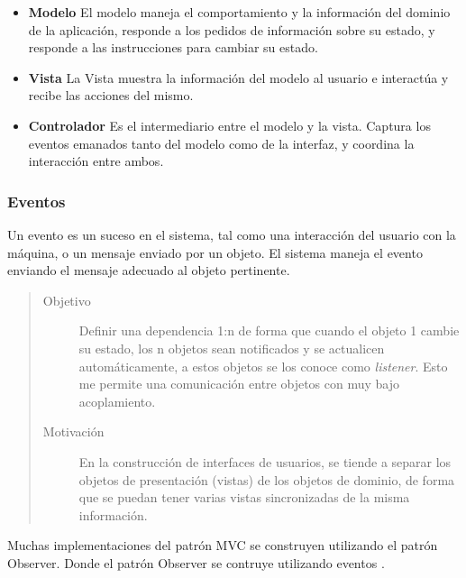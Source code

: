 	\begin {itemize}
	
		\item {\bf Modelo}
			El modelo maneja el comportamiento y la información del dominio de la
			aplicación, responde a los pedidos de información sobre su estado, 
			y responde a las instrucciones para cambiar su estado. 
			
			
		\item {\bf Vista}
			La Vista muestra la información del modelo al usuario e interactúa y recibe
			las acciones del mismo.
			
		\item {\bf Controlador}
			Es el intermediario entre el modelo y la vista.
			Captura los eventos emanados tanto del modelo como de la interfaz, y coordina
			la interacción entre ambos.
			
	
	\end {itemize}

\subsubsection{Eventos}
\label{Eventos}

	Un evento es un suceso en el sistema, tal como una interacción del usuario con
	la máquina, o un mensaje enviado por un objeto.  
	El sistema maneja el evento enviando el mensaje adecuado al objeto pertinente. 
	
	\begin{quote}
	
	\begin{description}
	   
	\item [Objetivo] Definir una dependencia 1:n de forma que cuando el objeto
		1 cambie su estado, los n objetos sean notificados y se actualicen
		automáticamente, a estos objetos se los conoce como \emph{listener}. Esto me
		permite una comunicación entre objetos con muy bajo acoplamiento.
	
	\item [Motivación] En la construcción de interfaces de usuarios, se tiende
		a separar los objetos de presentación (vistas) de los objetos de dominio, de
		forma que se puedan tener varias vistas sincronizadas de la misma información.
	
	\end{description}
	\end{quote}
	
	Muchas implementaciones del patrón MVC se construyen utilizando el 
	patrón Observer. Donde el patrón Observer se contruye
	utilizando eventos \cite{Gamma1995}.

